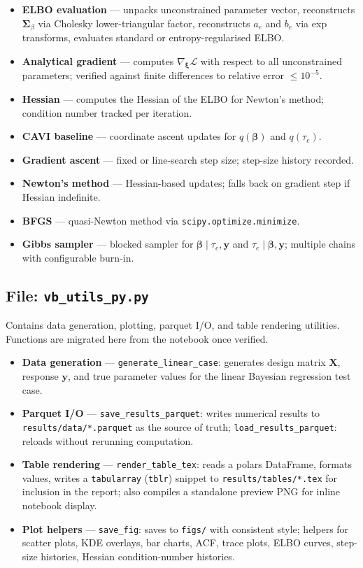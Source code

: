 \documentclass[11pt,a4paper]{article}
\begin{document}
\begin{itemize}
  \item \textbf{ELBO evaluation} — unpacks unconstrained parameter vector, reconstructs $\bm{\Sigma}_\beta$ via Cholesky lower-triangular factor, reconstructs $a_e$ and $b_e$ via exp transforms, evaluates standard or entropy-regularised ELBO.
  \item \textbf{Analytical gradient} — computes $\nabla_{\bm{\xi}} \mathcal{L}$ with respect to all unconstrained parameters; verified against finite differences to relative error $\leq 10^{-5}$.
  \item \textbf{Hessian} — computes the Hessian of the ELBO for Newton's method; condition number tracked per iteration.
  \item \textbf{CAVI baseline} — coordinate ascent updates for $q(\bm{\beta})$ and $q(\tau_e)$.
  \item \textbf{Gradient ascent} — fixed or line-search step size; step-size history recorded.
  \item \textbf{Newton's method} — Hessian-based updates; falls back on gradient step if Hessian indefinite.
  \item \textbf{BFGS} — quasi-Newton method via \texttt{scipy.optimize.minimize}.
  \item \textbf{Gibbs sampler} — blocked sampler for $\bm{\beta} \mid \tau_e, \bm{y}$ and $\tau_e \mid \bm{\beta}, \bm{y}$; multiple chains with configurable burn-in.
\end{itemize}

\subsection*{File: \texttt{vb\_utils\_py.py}}

Contains data generation, plotting, parquet I/O, and table rendering utilities. Functions are migrated here from the notebook once verified.

\begin{itemize}
  \item \textbf{Data generation} — \texttt{generate\_linear\_case}: generates design matrix $\bm{X}$, response $\bm{y}$, and true parameter values for the linear Bayesian regression test case.
  \item \textbf{Parquet I/O} — \texttt{save\_results\_parquet}: writes numerical results to \texttt{results/data/*.parquet} as the source of truth; \texttt{load\_results\_parquet}: reloads without rerunning computation.
  \item \textbf{Table rendering} — \texttt{render\_table\_tex}: reads a polars DataFrame, formats values, writes a \texttt{tabularray} (\texttt{tblr}) snippet to \texttt{results/tables/*.tex} for \verb|| inclusion in the report; also compiles a standalone preview PNG for inline notebook display.
  \item \textbf{Plot helpers} — \texttt{save\_fig}: saves to \texttt{figs/} with consistent style; helpers for scatter plots, KDE overlays, bar charts, ACF, trace plots, ELBO curves, step-size histories, Hessian condition-number histories.
\end{itemize}
\end{document}
